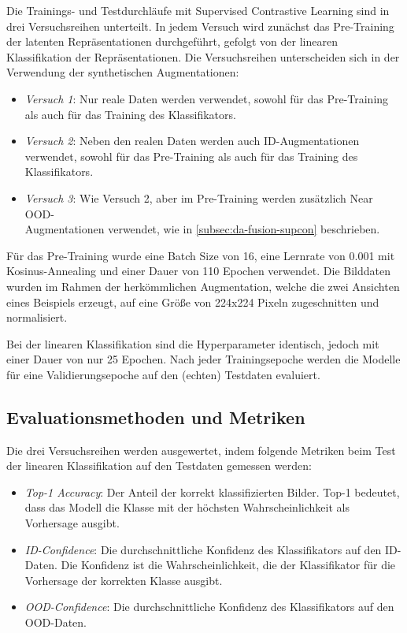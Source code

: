 Die Trainings- und Testdurchläufe mit Supervised Contrastive Learning sind in drei Versuchsreihen unterteilt. In jedem Versuch wird zunächst das Pre-Training der latenten Repräsentationen durchgeführt, gefolgt von der linearen Klassifikation der Repräsentationen. Die Versuchsreihen unterscheiden sich in der Verwendung der synthetischen Augmentationen:

\begin{itemize} %
	\item \emph{Versuch 1}: Nur reale Daten werden verwendet, sowohl für das Pre-Training als auch für das Training des Klassifikators.
	\item \emph{Versuch 2}: Neben den realen Daten werden auch ID-Augmentationen verwendet, sowohl für das Pre-Training als auch für das Training des Klassifikators.
	\item \emph{Versuch 3}: Wie Versuch 2, aber im Pre-Training werden zusätzlich Near OOD-\\Augmentationen verwendet, wie in \autoref{subsec:da-fusion-supcon} beschrieben.
\end{itemize}

Für das Pre-Training wurde eine Batch Size von 16, eine Lernrate von 0.001 mit Kosinus-Annealing und einer Dauer von 110 Epochen verwendet. Die Bilddaten wurden im Rahmen der herkömmlichen Augmentation, welche die zwei Ansichten eines Beispiels erzeugt, auf eine Größe von 224x224 Pixeln zugeschnitten und normalisiert.

Bei der linearen Klassifikation sind die Hyperparameter identisch, jedoch mit einer Dauer von nur 25 Epochen. Nach jeder Trainingsepoche werden die Modelle für eine Validierungsepoche auf den (echten) Testdaten evaluiert.

\subsection{Evaluationsmethoden und Metriken} \label{subsec:evaluation}

Die drei Versuchsreihen werden ausgewertet, indem folgende Metriken beim Test der linearen Klassifikation auf den Testdaten gemessen werden:

\begin{itemize}
	\item \emph{Top-1 Accuracy}: Der Anteil der korrekt klassifizierten Bilder. Top-1 bedeutet, dass das Modell die Klasse mit der höchsten Wahrscheinlichkeit als Vorhersage ausgibt.
	\item \emph{ID-Confidence}: Die durchschnittliche Konfidenz des Klassifikators auf den ID-Daten. Die Konfidenz ist die Wahrscheinlichkeit, die der Klassifikator für die Vorhersage der korrekten Klasse ausgibt.
	\item \emph{OOD-Confidence}: Die durchschnittliche Konfidenz des Klassifikators auf den OOD-Daten.
\end{itemize}


